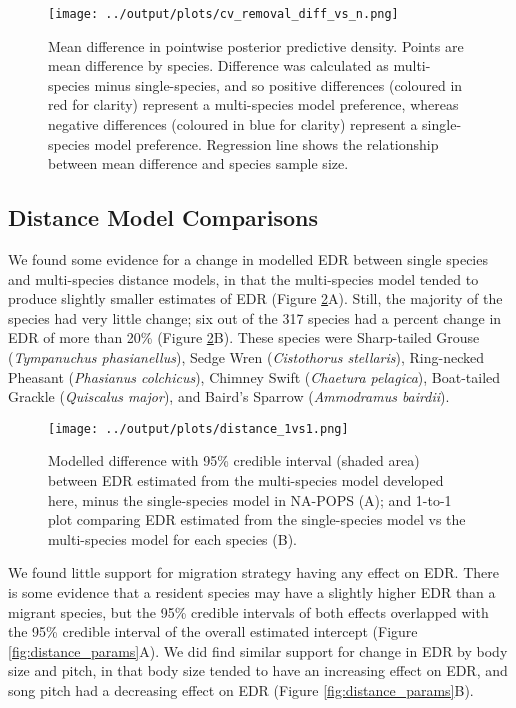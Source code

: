 \documentclass[12pt]{article}
\begin{document}
\begin{figure}[h!]
	\texttt{[image: ../output/plots/cv\_removal\_diff\_vs\_n.png]}
	\caption{Mean difference in pointwise posterior predictive density. Points are mean difference by species. Difference was calculated as multi-species minus single-species, and so positive differences (coloured in red for clarity) represent a multi-species model preference, whereas negative differences (coloured in blue for clarity) represent a single-species model preference. Regression line shows the relationship between mean difference and species sample size.}
	\label{fig:removal_cv}
\end{figure}

\subsection{Distance Model Comparisons}

\par We found some evidence for a change in modelled EDR between single species and multi-species distance models, in that the multi-species model tended to produce slightly smaller estimates of EDR (Figure \ref{fig:distance_1vs1}A). 
Still, the majority of the species had very little change; six out of the 317 species had a percent change in EDR of more than 20\% (Figure \ref{fig:distance_1vs1}B).
These species were Sharp-tailed Grouse (\textit{Tympanuchus phasianellus}), Sedge Wren (\textit{Cistothorus stellaris}), Ring-necked Pheasant (\textit{Phasianus colchicus}), Chimney Swift (\textit{Chaetura pelagica}), Boat-tailed Grackle (\textit{Quiscalus major}), and Baird's Sparrow (\textit{Ammodramus bairdii}).

\begin{figure}[h!]
	\texttt{[image: ../output/plots/distance\_1vs1.png]}
	\caption{Modelled difference with 95\% credible interval (shaded area) between EDR estimated from the multi-species model developed here, minus the single-species model in NA-POPS \citep{edwards_point_2023} (A); and 1-to-1 plot comparing EDR estimated from the single-species model vs the multi-species model for each species (B).}
	\label{fig:distance_1vs1}
\end{figure}

\par We found little support for migration strategy having any effect on EDR.
There is some evidence that a resident species may have a slightly higher EDR than a migrant species, but the 95\% credible intervals of both effects overlapped with the 95\% credible interval of the overall estimated intercept (Figure \ref{fig:distance_params}A).
We did find similar support for change in EDR by body size and pitch, in that body size tended to have an increasing effect on EDR, and song pitch had a decreasing effect on EDR (Figure \ref{fig:distance_params}B).
\end{document}

